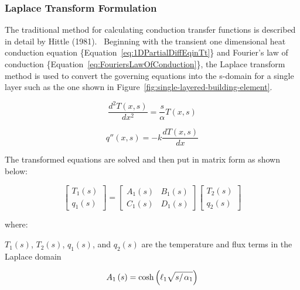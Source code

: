 \subsubsection{Laplace Transform Formulation}\label{laplace-transform-formulation}

The traditional method for calculating conduction transfer functions is described in detail by Hittle (1981).~ Beginning with the transient one dimensional heat conduction equation \{Equation~\ref{eq:1DPartialDiffEqinTt}\} and Fourier's law of conduction \{Equation~\ref{eq:FouriersLawOfConduction}\}, the Laplace transform method is used to convert the governing equations into the s-domain for a single layer such as the one shown in Figure~\ref{fig:single-layered-building-element}.

\begin{equation}
\frac{{{d^2}T\left( {x,s} \right)}}{{d{x^2}}} = \frac{s}{\alpha }T\left( {x,s} \right)
\end{equation}

\begin{equation}
q''\left( {x,s} \right) =  - k\frac{{dT\left( {x,s} \right)}}{{dx}}
\end{equation}

The transformed equations are solved and then put in matrix form as shown below:

\begin{equation}
\left[ 
    {\begin{array}{*{20}{c}}
      {{T_1}\left( s \right)} \\ {{q_1}\left( s \right)}
    \end{array}}
  \right] = \left[ 
    {\begin{array}{*{20}{c}}
      {{A_1}\left( s \right)}&{{B_1}\left( s \right)} \\
      {{C_1}\left( s \right)}&{{D_1}\left( s \right)}
    \end{array}}
  \right] \left[ 
    {\begin{array}{*{20}{c}}
      {{T_2}\left( s \right)} \\
      {{q_2}\left( s \right)}
    \end{array}}
  \right]
\end{equation}

where:

\(T_1(s)\), \(T_2(s)\), \(q_1(s)\), and \(q_2(s)\) are the temperature and flux terms in the Laplace domain

\begin{equation}
{A_1}\left( s \right) = \cosh \left( {{\ell_1}\sqrt {{s \mathord{\left/ {\vphantom {s {{\alpha_1}}}} \right. } {{\alpha_1}}}} } \right)
\end{equation}

